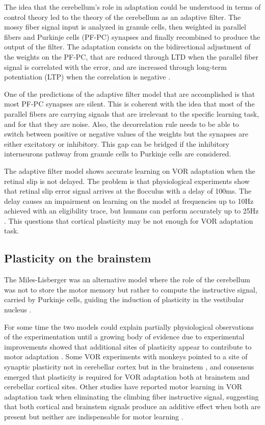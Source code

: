 \documentclass[doc,apacite,a4paper]{apa6}
\begin{document}
The idea that the cerebellum's role in adaptation could be understood in terms of control theory led to the theory of the cerebellum as an adaptive filter. The mossy fiber signal input is analyzed in granule cells, then weighted in parallel fibers and Purkinje cells (PF-PC) synapses and finally recombined to produce the output of the filter. The adaptation consists on the bidirectional adjustment of the weights on the PF-PC, that are reduced through LTD when the parallel fiber signal is correlated with the error, and are increased through long-term potentiation (LTP) when the correlation is negative \cite{Dean2010}.

One of the predictions of the adaptive filter model that are accomplished is that most PF-PC synapses are silent. This is coherent with the idea that most of the parallel fibers are carrying signals that are irrelevant to the specific learning task, and for that they are noise. Also, the decorrelation rule needs to be able to switch between positive or negative values of the weights but the synapses are either excitatory or inhibitory. This gap can be bridged if the inhibitory interneurons pathway from granule cells to Purkinje cells are considered.

The adaptive filter model shows accurate learning on VOR adaptation when the retinal slip is not delayed. The problem is that physiological experiments show that retinal slip error signal arrives at the flocculus with a delay of 100ms. The delay causes an impairment on learning on the model at frequencies up to 10Hz achieved with an eligibility trace, but humans can perform accurately up to 25Hz \cite{Porrill2007}. This questions that cortical plasticity may be not enough for VOR adaptation task.

\subsection{Plasticity on the brainstem}

The Miles-Lisberger was an alternative model where the role of the cerebellum was not to store the motor memory but rather to compute the instructive signal, carried by Purkinje cells, guiding the induction of plasticity in the vestibular nucleus \cite{Lac1995}.

For some time the two models could explain partially physiological observations of the experimentation until a growing body of evidence due to experimental improvements showed that additional sites of plasticity appear to contribute to motor adaptation \cite{Gao2012}. Some VOR experiments with monkeys pointed to a site of synaptic plasticity not in cerebellar cortex but in the brainstem \cite{Lisberger2009}, and consensus emerged that plasticity is required for VOR adaptation both at brainstem and cerebellar cortical sites. Other studies have reported motor learning in VOR adaptation task when eliminating the climbing fiber instructive signal, suggesting that both cortical and brainstem signals produce an additive effect when both are present but neither are indispensable for motor learning \cite{Ke2009a}.
\end{document}
